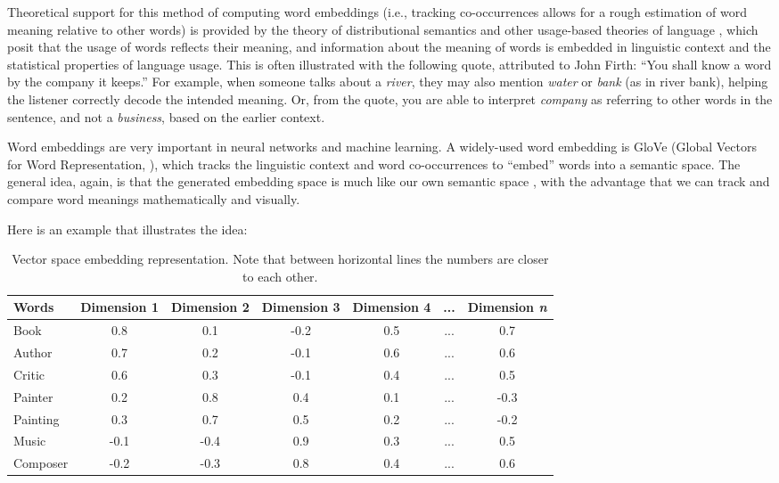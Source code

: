 Theoretical support for this method of computing word embeddings (i.e., tracking co-occurrences allows for a rough estimation of word meaning relative to other words) is provided by the theory of distributional semantics \cite{harris1954distributional, firth1957synopsis} and other usage-based theories of language \cite{wittgenstein1953philosophical}, which posit that the usage of words reflects their meaning, and information about the meaning of words is embedded in linguistic context and the statistical properties of language usage. This is often illustrated with the following quote, attributed to John Firth: ``You shall know a word by the company it keeps.'' For example, when someone talks about a \textit{river}, they may also mention \textit{water} or \textit{bank} (as in river bank), helping the listener correctly decode the intended meaning. Or, from the quote, you are able to interpret \textit{company} as referring to other words in the sentence, and not a \textit{business}, based on the earlier context.

Word embeddings are very important in neural networks and machine learning. A widely-used word embedding is GloVe (Global Vectors for Word Representation, \cite{pennington2014glove}), which tracks the linguistic context and word co-occurrences to ``embed'' words into a semantic space. The general idea, again, is that the generated embedding space is much like our own semantic space \cite{lewis2019distributional}, with the advantage that we can track and compare word meanings mathematically and visually.

Here is an example that illustrates the idea:
\begin{table}[h]
    \centering
    \begin{tabular}{|l|c|c|c|c|c|c|}
    \hline
    Words & Dimension 1 & Dimension 2 & Dimension 3 & Dimension 4 & ... & Dimension \textit{n} \\
    \hline
    Book    & 0.8 & 0.1 & -0.2 & 0.5 & ... & 0.7  \\
    Author  & 0.7 & 0.2 & -0.1 & 0.6 & ... & 0.6 \\
    Critic  & 0.6 & 0.3 & -0.1 & 0.4 & ... & 0.5  \\
    \hline
    Painter & 0.2 & 0.8 & 0.4 & 0.1 & ... & -0.3 \\
    Painting& 0.3 & 0.7 & 0.5 & 0.2 & ... & -0.2  \\
    \hline
    Music   & -0.1 & -0.4 & 0.9 & 0.3 & ... & 0.5  \\
    Composer& -0.2 & -0.3 & 0.8 & 0.4 & ... & 0.6 \\
    \hline
    \end{tabular}
    \caption{Vector space embedding representation. Note that between horizontal lines the numbers are closer to each other.}
    \label{exampleEmbeddings}
\end{table}


